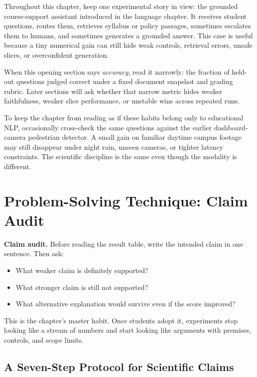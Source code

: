 Throughout this chapter, keep one experimental story in view: the grounded course-support assistant introduced in the language chapter. It receives student questions, routes them, retrieves syllabus or policy passages, sometimes escalates them to humans, and sometimes generates a grounded answer. This case is useful because a tiny numerical gain can still hide weak controls, retrieval errors, unsafe slices, or overconfident generation.

When this opening section says \emph{accuracy}, read it narrowly: the fraction of held-out questions judged correct under a fixed document snapshot and grading rubric. Later sections will ask whether that narrow metric hides weaker faithfulness, weaker slice performance, or unstable wins across repeated runs.

To keep the chapter from reading as if these habits belong only to educational NLP, occasionally cross-check the same questions against the earlier dashboard-camera pedestrian detector. A small gain on familiar daytime campus footage may still disappear under night rain, unseen cameras, or tighter latency constraints. The scientific discipline is the same even though the modality is different.

\section{Problem-Solving Technique: Claim Audit}

\begin{thinkingtool}
\textbf{Claim audit.} Before reading the result table, write the intended claim in one sentence. Then ask:
\begin{itemize}[leftmargin=*]
\item What weaker claim is definitely supported?
\item What stronger claim is still not supported?
\item What alternative explanation would survive even if the score improved?
\end{itemize}
\end{thinkingtool}

This is the chapter's master habit. Once students adopt it, experiments stop looking like a stream of numbers and start looking like arguments with premises, controls, and scope limits.

\subsection{A Seven-Step Protocol for Scientific Claims}

